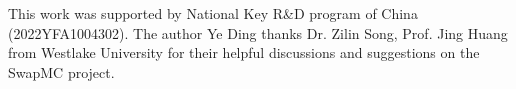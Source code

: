\documentclass[journal=jacsat,manuscript=article]{achemso}
\begin{document}
\begin{acknowledgement}
This work was supported by National Key R\&D program of China (2022YFA1004302).
The author Ye Ding thanks Dr. Zilin Song, Prof. Jing Huang from Westlake University for their helpful discussions and suggestions on the SwapMC project.
\end{acknowledgement}





\end{document}
